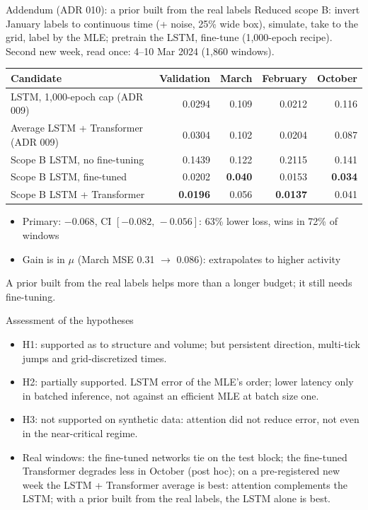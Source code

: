 \documentclass[aspectratio=169,11pt]{beamer}
\begin{document}
\begin{frame}{Addendum (ADR 010): a prior built from the real labels}
  Reduced scope B: invert January labels to continuous time (+ noise, 25\% wide box),
  simulate, take to the grid, label by the MLE; pretrain the LSTM, fine-tune
  (1,000-epoch recipe). Second new week, read once: 4--10 Mar 2024 (1,860 windows).
  \par\medskip
  \footnotesize
  \begin{tabular}{lrrrr}
    \toprule
    Candidate & Validation & March & February & October\\
    \midrule
    LSTM, 1,000-epoch cap (ADR 009) & 0.0294 & 0.109 & 0.0212 & 0.116\\
    Average LSTM + Transformer (ADR 009) & 0.0304 & 0.102 & 0.0204 & 0.087\\
    Scope B LSTM, no fine-tuning & 0.1439 & 0.122 & 0.2115 & 0.141\\
    Scope B LSTM, fine-tuned & 0.0202 & \textbf{0.040} & 0.0153 & \textbf{0.034}\\
    Scope B LSTM + Transformer & \textbf{0.0196} & 0.056 & \textbf{0.0137} & 0.041\\
    \bottomrule
  \end{tabular}
  \par\medskip\small
  \begin{itemize}
    \item Primary: \(-0.068\), CI \([-0.082,\,-0.056]\): \alert{63\% lower loss}, wins in 72\% of windows
    \item Gain is in \(\mu\) (March MSE 0.31 \(\to\) 0.086): extrapolates to higher activity
  \end{itemize}
  \par\medskip A prior built from the real labels helps more than a longer budget; it still needs fine-tuning.
\end{frame}

\begin{frame}{Assessment of the hypotheses}
  \begin{itemize}
    \item H1: \alert{supported} as to structure and volume; but persistent
          direction, multi-tick jumps and grid-discretized times.
    \item H2: \alert{partially supported}. LSTM error of the MLE's order; lower
          latency only in batched inference, not against an efficient MLE at batch size one.
    \item H3: \alert{not supported} on synthetic data: attention did not reduce
          error, not even in the near-critical regime.
    \item Real windows: the fine-tuned networks tie on the test block; the
          fine-tuned Transformer degrades less in October (post hoc); on a pre-registered new
          week the LSTM + Transformer average is best: attention complements the LSTM;
          with a prior built from the real labels, the LSTM alone is best.
  \end{itemize}
\end{frame}
\end{document}
